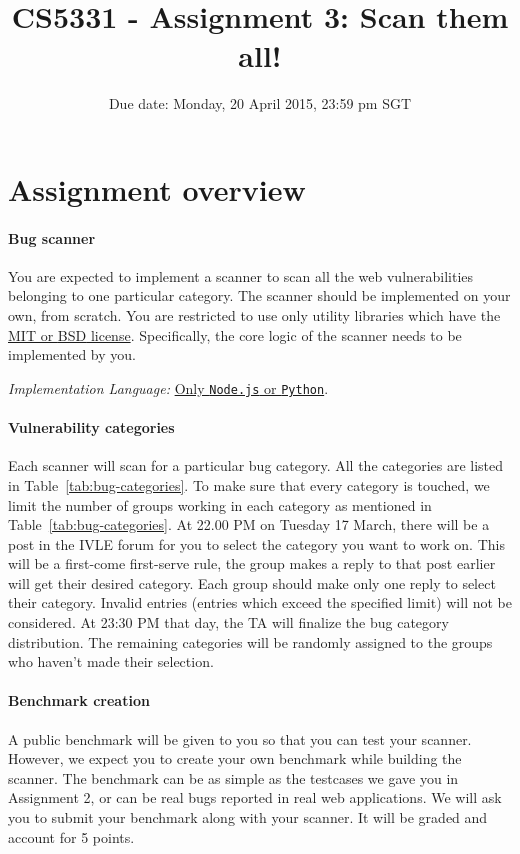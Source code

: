 \documentclass{article}[10pt]
\title{CS5331 - Assignment 3: Scan them all!}
\date{Due date: Monday, 20 April 2015, 23:59 pm SGT}
\begin{document}
\maketitle


\section{Assignment overview}

\paragraph{Bug scanner} You are expected to implement a scanner to scan all the web vulnerabilities belonging to one particular category. The scanner should be implemented on your own, from scratch. You are restricted to use only utility libraries which have the \underline{\href{http://opensource.org/licenses/MIT}{MIT} or \href{http://en.wikipedia.org/wiki/BSD_licenses}{BSD} license}. Specifically, the core logic of the scanner needs to be implemented by you.

\textit{Implementation Language:} \underline{Only {\tt Node.js} or {\tt Python}}.

\paragraph{Vulnerability categories} Each scanner will scan for a particular bug category. All the categories are listed in Table~\ref{tab:bug-categories}. To make sure that every category is touched, we limit the number of groups working in each category as mentioned in Table~\ref{tab:bug-categories}. At 22.00 PM on Tuesday 17 March, there will be a post in the IVLE forum for you to select the category you want to work on. This will be a first-come first-serve rule, the group makes a reply to that post earlier will get their desired category. Each group should make only one reply to select their category. Invalid entries (entries which exceed the specified limit) will not be considered. At 23:30 PM that day, the TA will finalize the bug category distribution. The remaining categories will be randomly assigned to the groups who haven't made their selection.

\paragraph{Benchmark creation} A public benchmark will be given to you so that you can test your scanner. However, we expect you to create your own benchmark while building the scanner. The benchmark can be as simple as the testcases we gave you in Assignment 2, or can be real bugs reported in real web applications.
We will ask you to submit your benchmark along with your scanner. It will be graded and account for 5 points.
\end{document}
